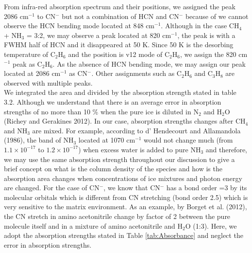 From infra-red absorption spectrum and their positions, we assigned the peak 2086 cm$^{-1}$ to CN$^-$  but not a combination of HCN and CN$^-$ because of we cannot observe the HCN bending mode located at 848 cm$^{-1}$. Although in the case CH$_4$ + NH$_3$ = 3:2, we may observe a peak located at 820 cm$^{-1}$, the peak is with a FWHM half of HCN and it disappeared at 50 K. Since 50 K is the desorbing temperature of C$_2$H$_6$ and the position is v12 mode of C$_2$H$_6$, we assign the 820 cm$^{-1}$ peak as C$_2$H$_6$. As the absence of HCN bending mode, we may assign our peak located at 2086 cm$^{-1}$ as CN$^-$. Other assignments such as C$_2$H$_6$ and C$_3$H$_8$ are observed with multiple peaks.\\
We integrated the area and divided by the absorption strength stated in table 3.2. Although we understand that there is an average error in absorption strengths of no more than 10 \%  when the pure ice is diluted in N$_2$ and H$_2$O (Richey and Gerakines 2012). In our case, absorption strengths changes after CH$_4$ and NH$_3$ are mixed. For example, according to d' Hendecourt and Allamandola (1986), the band of NH$_3$ located at 1070 cm$^{-1}$ would not change much (from $1.1 \times 10^{-17}$ to $1.2 \times 10^{-17}$) when excess water is added to pure NH$_3$ and therefore, we may use the same absorption strength throughout our discussion to give a brief concept on what is the column density of the species and how is the absorption area changes when concentrations of ice mixtures and photon energy are changed. For the case of CN$^-$, we know that CN$^-$ has a bond order =3 by its molecular orbitals which is different from CN stretching (bond order 2.5) which is very sensitive to the matrix environment. As an example, by Borget et al. (2012), the CN stretch in amino acetonitrile change by factor of 2 between the pure molecule itself and in a mixture of amino acetonitrile and H$_2$O (1:3). Here, we adopt the absorption strengths stated in Table \ref{tab:Absorbance} and neglect the error in absorption strengths.\\


